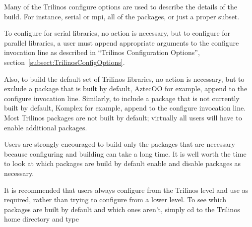 Many of the Trilinos configure options are used to describe the details of the 
build.  For 
instance, serial or mpi, all of the packages, or just a proper subset.  

To configure for serial libraries, no action is necessary,
but to configure for parallel libraries, a user must append appropriate 
arguments to the configure invocation line as described in ``Trilinos 
Configuration Options'', section~\ref{subsect:TrilinosConfigOptions}.

Also, to build the default set of Trilinos libraries, no action is 
necessary, but to exclude a package that is built by default, AztecOO for 
example, append \newline {} to the configure 
invocation  line.  Similarly, to include a package that is not currently built 
by default, Komplex for example, append  to 
the configure invocation line.  Most Trilinos packages are not built by
default; virtually all users will have to enable additional packages. 

\begin{minipage}[c]{\textwidth}
\begin{minipage}[l]{.6\textwidth}

Users are strongly encouraged to build 
only the packages that are necessary because configuring and 
building can take a long time.  It is well worth the time to look at which
packages are build by default enable and disable packages as necessary.
\end{minipage}\hfill
{}
\end{minipage}

It is recommended that users always configure 
from the Trilinos level and use  as 
required, rather than trying to configure from a lower level.  To see which 
packages are built by default and which ones aren't, simply cd to the Trilinos home directory and type 


